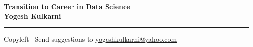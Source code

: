 
\graphicspath{{images/}}

\footnotesize


\begin{center}
\Large{\textbf{Transition to Career in Data Science\\ Yogesh Kulkarni}}  
\end{center}

\begin{multicols}{2}
% 

\end{multicols}

\rule{\linewidth}{0.25pt}
\scriptsize
Copyleft \textcopyleft\  Send suggestions to 
\href{http://www.yogeshkulkarni.com}{yogeshkulkarni@yahoo.com}


